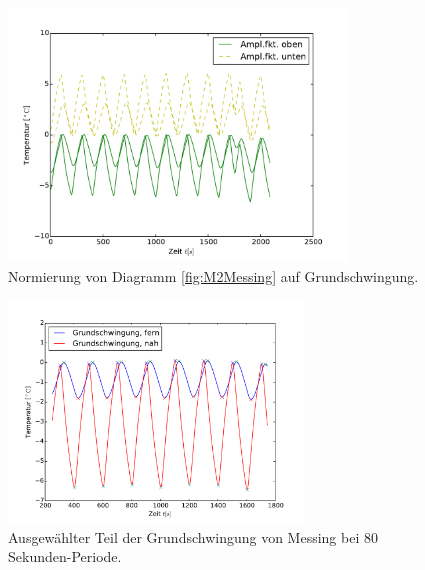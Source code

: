 \begin{figure}[h!]
	\centering
	\includegraphics[width=0.8\textwidth]{Bilder/Normierungsauswahl/M2_Alu_norm.pdf}
	\caption{Normierung von Diagramm \ref{fig:M2Messing} auf Grundschwingung.}
	\label{fig:M2MessingNorm}
\end{figure}
\begin{figure}[h!]
	\centering
	\includegraphics[width=0.7\textwidth]{Bilder/M2_Messing_norm.pdf}
	\caption{Ausgewählter Teil der Grundschwingung von Messing bei 80 Sekunden-Periode.}
	\label{fig:M2MessingNormkurve}
\end{figure}
